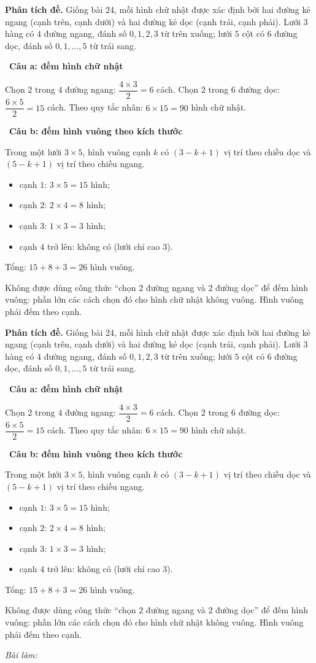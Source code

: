 \documentclass[11pt]{article}
\newif\ifsol \soltrue
\newcommand{\StuProb}[2]{\begin{probboxS}{#1}{#2}\StuProbBody\end{probboxS}}
\newcommand{\probsol}[1]{%
  \begin{lrbox}{\solmeasure}\begin{minipage}{\dimexpr\linewidth-24pt\relax}#1\end{minipage}\end{lrbox}%
  \ifsol
    \begin{solbox}#1\end{solbox}%
  \else
    \setlength{\solht}{\dimexpr\ht\solmeasure+\dp\solmeasure+0.85cm\relax}%
    \ifdim\solht<1.35cm\setlength{\solht}{1.35cm}\fi
    \ifdim\solht>\StudentMaxWork\setlength{\solht}{\StudentMaxWork}\fi
    \par\noindent\begin{minipage}{\linewidth}%
    \expandafter\StuProb\StuProbArgs
    \begin{tcolorbox}[colback=white,colframe=Line,boxrule=0.8pt,arc=5pt,
      left=8pt,right=8pt,top=4pt,bottom=4pt,height=\solht]{\footnotesize\color{Slate}\itshape\WorkWord}\end{tcolorbox}%
    \end{minipage}\par\medskip
  \fi}
\newlength{\StudentMaxWork}\setlength{\StudentMaxWork}{4.5cm}
\newcommand{\step}[2]{\par\smallskip\noindent{\bfseries\color{tmBlue!85!black}\StepWord~#1.}\ {\bfseries #2}\par\nopagebreak}
\def\WorkWord{Bài làm:}
\def\StepWord{Bước}
\begin{document}
\probsol{
\textbf{Phân tích đề.} Giống bài 24, mỗi hình chữ nhật được xác định bởi hai đường kẻ ngang (cạnh trên, cạnh dưới) và hai đường kẻ dọc
(cạnh trái, cạnh phải). Lưới $3$ hàng có $4$ đường ngang, đánh số $0,1,2,3$ từ trên xuống; lưới $5$ cột có $6$ đường dọc, đánh số
$0,1,\dots,5$ từ trái sang.

\step{1}{Câu a: đếm hình chữ nhật}
Chọn $2$ trong $4$ đường ngang: $\dfrac{4\times3}{2}=6$ cách. Chọn $2$ trong $6$ đường dọc: $\dfrac{6\times5}{2}=15$ cách.
Theo quy tắc nhân: $6\times15=90$ hình chữ nhật.

\step{2}{Câu b: đếm hình vuông theo kích thước}
\begin{recallbox}Trong một lưới $3\times5$, hình vuông cạnh $k$ có $(3-k+1)$ vị trí theo chiều dọc và $(5-k+1)$ vị trí theo chiều ngang.\end{recallbox}
\begin{itemize}[leftmargin=1.2em,itemsep=1pt,topsep=2pt]
\item cạnh $1$: $3\times5=15$ hình;
\item cạnh $2$: $2\times4=8$ hình;
\item cạnh $3$: $1\times3=3$ hình;
\item cạnh $4$ trở lên: không có (lưới chỉ cao $3$).
\end{itemize}
Tổng: $15+8+3=26$ hình vuông.
\begin{warnbox}Không được dùng công thức ``chọn $2$ đường ngang và $2$ đường dọc'' để đếm hình vuông: phần lớn các cách chọn đó cho hình chữ
nhật không vuông. Hình vuông phải đếm theo cạnh.\end{warnbox}

}
\end{document}
